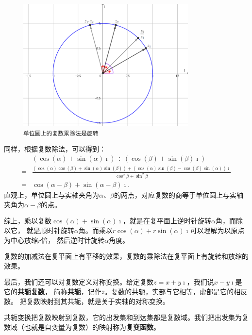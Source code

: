 \documentclass[12pt,UTF8]{ctexbook}
\theoremstyle{definition}
\theoremstyle{plain}
\begin{document}
\begin{figure}[h] 
    \centering
    \includegraphics[width=0.8\textwidth]{tu/复数乘法1.png}
    \caption*{\texttt{单位圆上的复数乘除法是旋转}}
\end{figure}


同样，根据复数除法，可以得到：
\begin{align*}
    & (\cos{(\alpha)} + \sin{(\alpha)}\imath) \div (\cos{(\beta)} + \sin{(\beta)}\imath) \\
   =& \frac{(\cos{(\alpha)}\cos{(\beta)} + \sin{(\alpha)}\sin{(\beta)}) + (\cos{(\alpha)}\sin{(\beta)} - \cos{(\beta)}\sin{(\alpha)})\imath}{\cos^2{\beta}+\sin^2{\beta}} \\
   =& \cos{(\alpha - \beta)} + \sin{(\alpha - \beta)}\imath.
\end{align*}
直观上，单位圆上与实轴夹角为$\alpha$、$\beta$的两点，对应复数的商等于单位圆上与实轴夹角为$\alpha-\beta$的点。

综上，乘以复数$\cos{(\alpha)} + \sin{(\alpha)}\imath$，就是在复平面上逆时针旋转$\alpha$角，而除以它，
就是顺时针旋转$\alpha$角。而乘以$r\cos{(\alpha)} + r\sin{(\alpha)}\imath$可以理解为以原点为中心放缩$r$倍，
然后逆时针旋转$\alpha$角度。

复数的加减法在复平面上有平移的效果，复数的乘除法在复平面上有旋转和放缩的效果。

最后，我们还可以对复数定义对称变换。给定复数$z = x+ y\imath$，我们说$x - y\imath$是它的\textbf{共轭复数}，
简称\textbf{共轭}，记作$\overline{z}$。复数的共轭，实部与它相等，虚部是它的相反数。
把复数映射到其共轭，就是关于实轴的对称变换。

共轭变换把复数映射到复数，它的出发集和到达集都是复数域。我们把出发集为复数域（也就是自变量为复数）的映射称为\textbf{复变函数}。
\end{document}
